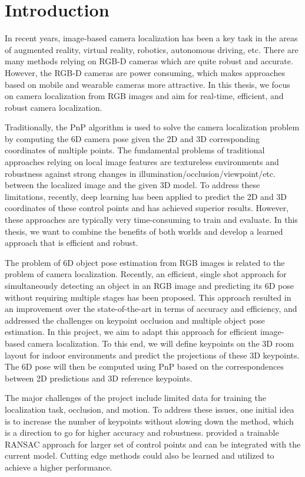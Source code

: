 \chapter{Introduction}

In recent years, image-based camera localization has been a key task in the areas of augmented reality, virtual reality, robotics, autonomous driving, etc. There are many methods relying on RGB-D cameras which are quite robust and accurate. However, the RGB-D cameras are power consuming, which makes approaches based on mobile and wearable cameras more attractive. In this thesis, we focus on camera localization from RGB images and aim for real-time, efficient, and robust camera localization.

Traditionally, the PnP \cite{lepetit2009epnp} algorithm is used to solve the camera localization problem by computing the 6D camera pose given the 2D and 3D corresponding coordinates of multiple points. The fundamental problems of traditional approaches relying on local image features are textureless environments and robustness against strong changes in illumination/occlusion/viewpoint/etc. between the localized image and the given 3D model. To address these limitations, recently, deep learning has been applied to predict the 2D and 3D coordinates of these control points \cite{brachmann2017dsac} and has achieved superior results. However, these approaches are typically very time-consuming to train and evaluate. In this thesis, we want to combine the benefits of both worlds and develop a learned approach that is efficient and robust.

The problem of 6D object pose estimation from RGB images is related to the problem of camera localization. Recently, an efficient, single shot approach \cite{tekin2018real} for simultaneously detecting an object in an RGB image and predicting its 6D pose without requiring multiple stages has been proposed. This approach resulted in an improvement over the state-of-the-art in terms of accuracy and efficiency, and addressed the challenges on keypoint occlusion and multiple object pose estimation. In this project, we aim to adapt this approach for efficient image-based camera localization. To this end, we will define keypoints on the 3D room layout for indoor environments and predict the projections of these 3D keypoints. The 6D pose will then be computed using PnP \cite{lepetit2009epnp} based on the correspondences between 2D predictions and 3D reference keypoints.

The major challenges of the project include limited data for training the localization task, occlusion, and motion. To address these issues, one initial idea is to increase the number of keypoints without slowing down the method, which is a direction to go for higher accuracy and robustness. \cite{brachmann2017dsac} provided a trainable RANSAC approach for larger set of control points and can be integrated with the current model. Cutting edge methods could also be learned and utilized to achieve a higher performance.


